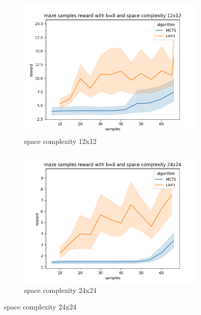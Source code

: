 \documentclass[bibliography=totoc]{scrartcl}
\begin{document}
\begin{figure}[h!]
    \centering
    \begin{subfigure}[b]{0.3\linewidth}
        \includegraphics[width=\linewidth]{img/maze_samples__reward_b_8_LAP3_MCTS_12.png}
        \caption{space complexity 12x12}
    \end{subfigure}
    \hspace{0.02\textwidth}
    \begin{subfigure}[b]{0.3\linewidth}
        \includegraphics[width=\linewidth]{img/maze_samples__reward_b_8_LAP3_MCTS_24.png}
        \caption{space complexity 24x24}
    \end{subfigure}
    \hspace{0.02\textwidth}

\end{figure}
\end{document}
